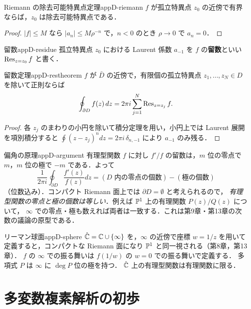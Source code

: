 \begin{myprop}{Riemann の除去可能特異点定理}{appD-riemann}
$f$ が孤立特異点 $z_0$ の近傍で有界ならば，$z_0$ は除去可能特異点である．
\end{myprop}
\begin{proof}
$|f|\leq M$ なら $|a_n|\leq M\rho^{-n}$ で，$n<0$ のとき $\rho\to0$ で $a_n=0$．
\end{proof}

\begin{mydef}{留数}{appD-residue}
孤立特異点 $z_0$ における Laurent 係数 $a_{-1}$ を $f$ の\textbf{留数}といい $\operatorname{Res}_{z=z_0}f$ と書く．
\end{mydef}

\begin{mythm}{留数定理}{appD-restheorem}
$f$ が $\bar D$ の近傍で，有限個の孤立特異点 $z_1,\dots,z_N\in D$ を除いて正則ならば
\[
\oint_{\partial D}f(z)\,dz=2\pi i\sum_{j=1}^N\operatorname{Res}_{z=z_j}f .
\]
\end{mythm}
\begin{proof}
各 $z_j$ のまわりの小円を除いて積分定理を用い，小円上では Laurent 展開を項別積分すると
$\oint(z-z_j)^ndz=2\pi i\,\delta_{n,-1}$ により $a_{-1}$ のみ残る．
\end{proof}

\begin{myex}{偏角の原理}{appD-argument}
有理型関数 $f$ に対し $f'/f$ の留数は，$m$ 位の零点で $m$，$m$ 位の極で $-m$ である．よって
\[
\frac1{2\pi i}\oint_{\partial D}\frac{f'(z)}{f(z)}dz=(\text{$D$ 内の零点の個数})-(\text{極の個数})
\]
（位数込み）．コンパクト Riemann 面上では $\partial D=\emptyset$ と考えられるので，
\emph{有理型関数の零点と極の個数は等しい}．例えば $\mathbb{P}^1$ 上の有理関数 $P(z)/Q(z)$ について，
$\infty$ での零点・極も数えれば両者は一致する．これは第9章・第13章の次数の議論の原型である．
\end{myex}

\begin{myex}{リーマン球面}{appD-sphere}
$\hat{\mathbb{C}}=\mathbb{C}\cup\{\infty\}$ を，$\infty$ の近傍で座標 $w=1/z$ を用いて定義すると，コンパクトな Riemann 面になり $\mathbb{P}^1$ と同一視される（第8章，第13章）．
$f$ の $\infty$ での振る舞いは $f(1/w)$ の $w=0$ での振る舞いで定義する．
多項式 $P$ は $\infty$ に $\deg P$ 位の極を持つ．
$\hat{\mathbb{C}}$ 上の有理型関数は有理関数に限る．
\end{myex}

\section{多変数複素解析の初歩}


